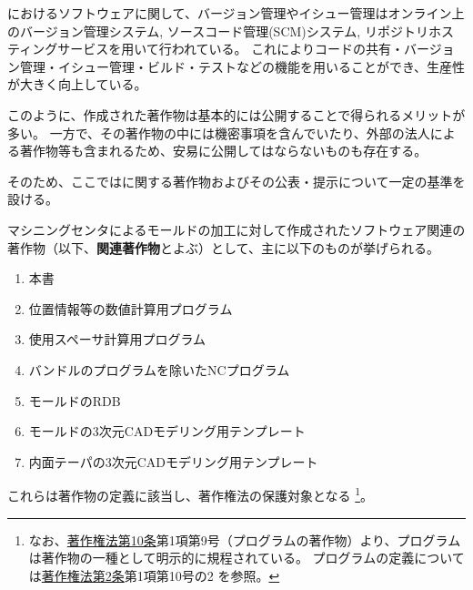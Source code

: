 

\DMname におけるソフトウェアに関して、バージョン管理やイシュー管理はオンライン上のバージョン管理システム, ソースコード管理(SCM)システム, リポジトリホスティングサービスを用いて行われている。
これによりコードの共有・バージョン管理・イシュー管理・ビルド・テストなどの機能を用いることができ、生産性が大きく向上している。

このように、作成された著作物は基本的には公開することで得られるメリットが多い。
一方で、その著作物の中には機密事項を含んでいたり、外部の法人による著作物等も含まれるため、安易に公開してはならないものも存在する。

そのため、ここでは\DMname に関する著作物およびその公表・提示について一定の基準を設ける。


マシニングセンタによるモールドの加工に対して作成されたソフトウェア関連の著作物（以下、\textbf{関連著作物}とよぶ）として、主に以下のものが挙げられる。
\begin{enumerate}
\item 本書
\item 位置情報等の数値計算用プログラム
\item 使用スペーサ計算用プログラム
\item バンドルのプログラムを除いたNCプログラム
\item モールドのRDB
\item モールドの3次元CADモデリング用テンプレート
\item 内面テーパの3次元CADモデリング用テンプレート
\end{enumerate}
これらは著作物の定義に該当し、著作権法の保護対象となる
\footnote{なお、\href{https://elaws.e-gov.go.jp/document?lawid=345AC0000000048\#Mp-At_10}{著作権法第10条}第1項第9号（プログラムの著作物）\cite{eGovCopyrightLaw}より、プログラムは著作物の一種として明示的に規程されている。
プログラムの定義については\href{https://elaws.e-gov.go.jp/document?lawid=345AC0000000048\#Mp-At_2}{著作権法第2条}第1項第10号の2 \cite{eGovCopyrightLaw}を参照。}。



